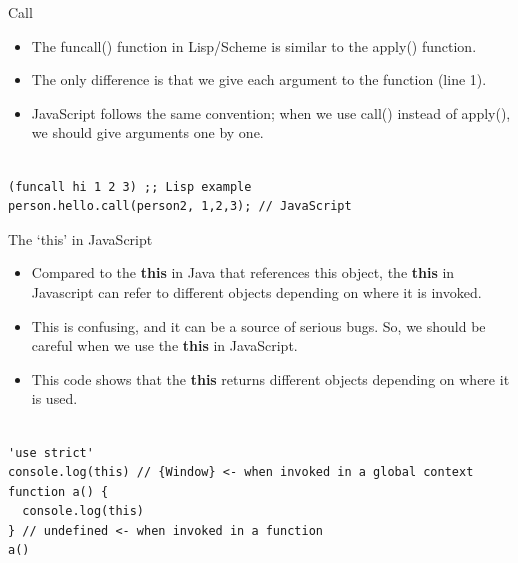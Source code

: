 \begin{frame}[fragile]{Call}

\begin{itemize}
	\item The funcall() function in Lisp/Scheme is similar to the apply() function.
	\item The only difference is that we give each argument to the function (line 1). 
	\item JavaScript follows the same convention; when we use call() instead of apply(), we should give arguments one by one. 
\end{itemize}

\begin{Code}{}%
\begin{lstlisting}[firstnumber=1, label=glabels, xleftmargin=0pt, basicstyle=\scriptsize]% 

(funcall hi 1 2 3) ;; Lisp example
person.hello.call(person2, 1,2,3); // JavaScript
\end{lstlisting}%
\end{Code}%

\end{frame}

\begin{frame}[fragile]{The `this' in JavaScript}

\begin{itemize}
	\item Compared to the \textbf{this} in Java that references this object, the \textbf{this} in Javascript can refer to different objects depending on where it is invoked. 
	\item This is confusing, and it can be a source of serious bugs. So, we should be careful when we use the \textbf{this} in JavaScript. 
	\item This code shows that the \textbf{this} returns different objects depending on where it is used. 
\end{itemize}

\begin{Code}{}%
\begin{lstlisting}[firstnumber=1, label=glabels, xleftmargin=0pt, basicstyle=\tiny]% 

'use strict'
console.log(this) // {Window} <- when invoked in a global context
function a() { 
  console.log(this)
} // undefined <- when invoked in a function
a() 
\end{lstlisting}%
\end{Code}%
\end{frame}